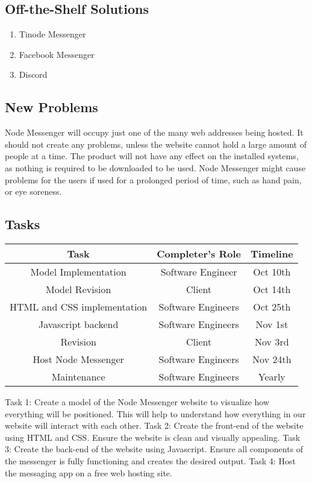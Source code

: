 \documentclass[12pt, titlepage]{article}
\begin{document}
    	\subsection{Off-the-Shelf Solutions}
    	\begin{enumerate}
    	    \item Tinode Messenger
    	    \item Facebook Messenger
    	    \item Discord
    	\end{enumerate}

    	\subsection{New Problems}
    	Node Messenger will occupy just one of the many web addresses being hosted. It should not create any problems, unless the website cannot hold a large amount of people at a time. The product will not have any effect on the installed systems, as nothing is required to be downloaded to be used. Node Messenger might cause problems for the users if used for a prolonged period of time, such as hand pain, or eye soreness. 

    	\subsection{Tasks}
    	\begin{center}
    		\begin{tabular}{|c|c|c|}
    		\hline 
    		Task & Completer's Role & Timeline \\ 
    		\hline 
    		Model Implementation & Software Engineer & Oct 10th \\ 
    		\hline 
    		Model Revision & Client & Oct 14th \\ 
    		\hline 
    		HTML and CSS implementation & Software Engineers & Oct 25th \\ 
    		\hline 
    		Javascript backend & Software Engineers &  Nov 1st\\ 
    		\hline 
    		Revision & Client & Nov 3rd \\ 
    		\hline 
    		Host Node Messenger& Software Engineers & Nov 24th \\ 
    		\hline 
    		Maintenance & Software Engineers & Yearly \\ 
    		\hline 
    	\end{tabular} 
    	\end{center}
		Task 1: Create a model of the Node Messenger website to visualize how everything will be positioned. This will help to understand how everything in our website will interact with each other. Task 2: Create the front-end of the website using HTML and CSS. Ensure the website is clean and visually appealing. Task 3: Create the back-end of the website using Javascript. Ensure all components of the messenger is fully functioning and creates the desired output. Task 4: Host the messaging app on a free web hosting site.
\end{document}
